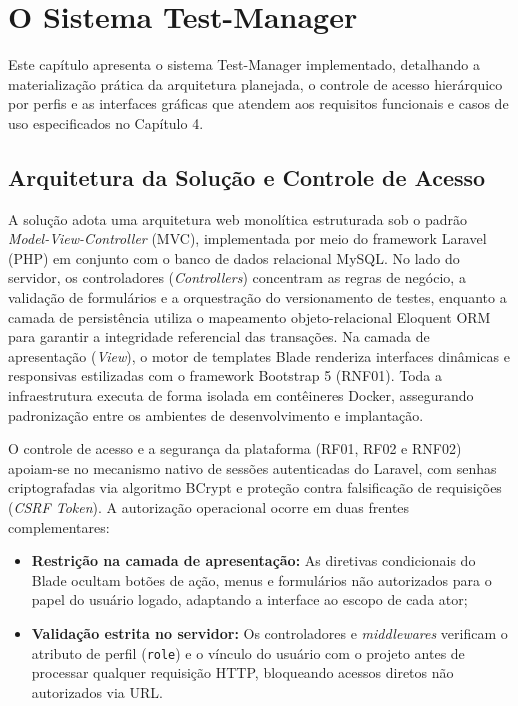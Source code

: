 \chapter{O Sistema Test-Manager}

Este capítulo apresenta o sistema Test-Manager implementado, detalhando a materialização prática da arquitetura planejada, o controle de acesso hierárquico por perfis e as interfaces gráficas que atendem aos requisitos funcionais e casos de uso especificados no Capítulo 4.

\section{Arquitetura da Solução e Controle de Acesso}

A solução adota uma arquitetura web monolítica estruturada sob o padrão \textit{Model-View-Controller} (MVC), implementada por meio do framework Laravel (PHP) em conjunto com o banco de dados relacional MySQL. No lado do servidor, os controladores (\textit{Controllers}) concentram as regras de negócio, a validação de formulários e a orquestração do versionamento de testes, enquanto a camada de persistência utiliza o mapeamento objeto-relacional Eloquent ORM para garantir a integridade referencial das transações. Na camada de apresentação (\textit{View}), o motor de templates Blade renderiza interfaces dinâmicas e responsivas estilizadas com o framework Bootstrap 5 (RNF01). Toda a infraestrutura executa de forma isolada em contêineres Docker, assegurando padronização entre os ambientes de desenvolvimento e implantação.

O controle de acesso e a segurança da plataforma (RF01, RF02 e RNF02) apoiam-se no mecanismo nativo de sessões autenticadas do Laravel, com senhas criptografadas via algoritmo BCrypt e proteção contra falsificação de requisições (\textit{CSRF Token}). A autorização operacional ocorre em duas frentes complementares:
\begin{itemize}
    \item \textbf{Restrição na camada de apresentação:} As diretivas condicionais do Blade ocultam botões de ação, menus e formulários não autorizados para o papel do usuário logado, adaptando a interface ao escopo de cada ator;
    \item \textbf{Validação estrita no servidor:} Os controladores e \textit{middlewares} verificam o atributo de perfil (\texttt{role}) e o vínculo do usuário com o projeto antes de processar qualquer requisição HTTP, bloqueando acessos diretos não autorizados via URL.
\end{itemize}


